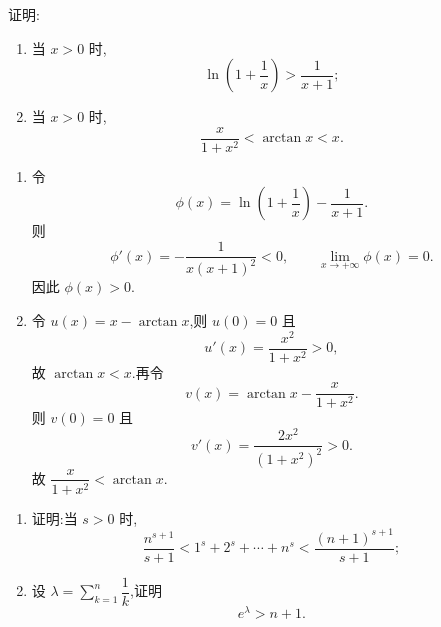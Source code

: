 
\begin{example}
    证明:
    \begin{enumerate}
        \item 当 $x>0$ 时,
              \[
                  \ln\left(1+\dfrac{1}{x}\right)>\dfrac{1}{x+1};
              \]
        \item 当 $x>0$ 时,
              \[
                  \dfrac{x}{1+x^2}<\arctan x<x.
              \]
    \end{enumerate}
\end{example}
\exampleblank

\begin{solution}
    \leavevmode
    \begin{enumerate}
        \item 令
              \[
                  \phi(x)=\ln\left(1+\dfrac{1}{x}\right)-\dfrac{1}{x+1}.
              \]
              则
              \[
                  \phi'(x)=-\dfrac{1}{x(x+1)^2}<0,
                  \qquad
                  \lim\limits_{x\to+\infty}\phi(x)=0.
              \]
              因此 $\phi(x)>0$.

        \item 令 $u(x)=x-\arctan x$,则 $u(0)=0$ 且
              \[
                  u'(x)=\dfrac{x^2}{1+x^2}>0,
              \]
              故 $\arctan x<x$.再令
              \[
                  v(x)=\arctan x-\dfrac{x}{1+x^2}.
              \]
              则 $v(0)=0$ 且
              \[
                  v'(x)=\dfrac{2x^2}{(1+x^2)^2}>0.
              \]
              故 $\dfrac{x}{1+x^2}<\arctan x$.
    \end{enumerate}
\end{solution}

\begin{example}
    \begin{enumerate}
        \item 证明:当 $s>0$ 时,
              \[
                  \dfrac{n^{s+1}}{s+1}
                  <1^s+2^s+\cdots+n^s
                  <\dfrac{(n+1)^{s+1}}{s+1};
              \]
        \item 设 $\displaystyle\lambda=\sum\limits_{k=1}^n\dfrac{1}{k}$,证明
              \[
                  e^\lambda>n+1.
              \]
    \end{enumerate}
\end{example}
\exampleblank

